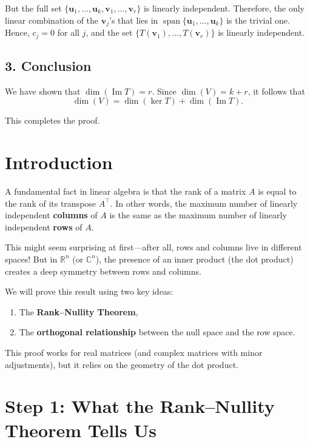 But the full set $ \{ \mathbf{u}_1, \dots, \mathbf{u}_k, \mathbf{v}_1, \dots, \mathbf{v}_r \} $ is linearly independent.  
Therefore, the only linear combination of the $ \mathbf{v}_j $'s that lies in $ \operatorname{span}\{ \mathbf{u}_1, \dots, \mathbf{u}_k \} $ is the trivial one.  
Hence, $ c_j = 0 $ for all $ j $, and the set $ \{ T(\mathbf{v}_1), \dots, T(\mathbf{v}_r) \} $ is linearly independent.

\subsection*{3. Conclusion}

We have shown that $ \dim(\operatorname{Im} T) = r $. Since $ \dim(V) = k + r $, it follows that
\[
\dim(V) = \dim(\ker T) + \dim(\operatorname{Im} T).
\]

This completes the proof.


\section*{Introduction}

A fundamental fact in linear algebra is that the rank of a matrix $ A $ is equal to the rank of its transpose $ A^\top $.  
In other words, the maximum number of linearly independent \textbf{columns} of $ A $ is the same as the maximum number of linearly independent \textbf{rows} of $ A $.

This might seem surprising at first—after all, rows and columns live in different spaces!  
But in $ \mathbb{R}^n $ (or $ \mathbb{C}^n $), the presence of an inner product (the dot product) creates a deep symmetry between rows and columns.

We will prove this result using two key ideas:
\begin{enumerate}
    \item The \textbf{Rank--Nullity Theorem},
    \item The \textbf{orthogonal relationship} between the null space and the row space.
\end{enumerate}

This proof works for real matrices (and complex matrices with minor adjustments), but it relies on the geometry of the dot product.

\section*{Step 1: What the Rank--Nullity Theorem Tells Us}

